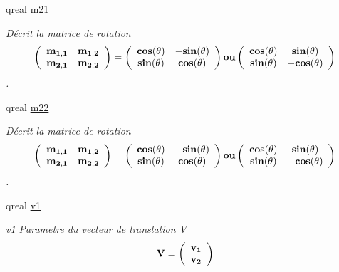 \begin{DoxyCompactItemize}
qreal \hyperlink{class_application_a57f2364c5671f6ade315024cff46c975}{m21}
\begin{DoxyCompactList}\small\item\em Décrit la matrice de rotation \[ \bf \left( \begin{array}{ccc} \bf m_{1,1} & \bf m_{1,2} \\ \bf m_{2,1} & \bf m_{2,2} \\ \end{array} \bf\right) \bf= \bf\left( \begin{array}{ccc} \bf cos(\bf\theta) & \bf -sin(\bf\theta) \\ \bf sin(\bf\theta) & \bf cos(\bf\theta) \\ \end{array} \bf\right) \bf ou \bf\left( \begin{array}{ccc} \bf cos(\bf\theta) & \bf sin(\bf\theta) \\ \bf sin(\bf\theta) & \bf -cos(\bf\theta) \\ \end{array} \bf\right) \]. \end{DoxyCompactList}\item 
qreal \hyperlink{class_application_aa3e7dad170dc62450e06855fdeea42af}{m22}
\begin{DoxyCompactList}\small\item\em Décrit la matrice de rotation \[ \bf \left( \begin{array}{ccc} \bf m_{1,1} & \bf m_{1,2} \\ \bf m_{2,1} & \bf m_{2,2} \\ \end{array} \bf\right) \bf= \bf\left( \begin{array}{ccc} \bf cos(\bf\theta) & \bf -sin(\bf\theta) \\ \bf sin(\bf\theta) & \bf cos(\bf\theta) \\ \end{array} \bf\right) \bf ou \bf\left( \begin{array}{ccc} \bf cos(\bf\theta) & \bf sin(\bf\theta) \\ \bf sin(\bf\theta) & \bf -cos(\bf\theta) \\ \end{array} \bf\right) \]. \end{DoxyCompactList}\item 
qreal \hyperlink{class_application_aec5855e0925af60f70007a7836883372}{v1}
\begin{DoxyCompactList}\small\item\em v1 Parametre du vecteur de translation V \[\bf V\bf= \bf\left( \begin{array}{ccc} \bf v_{1}\\ \bf v_{2}\\ \end{array} \bf\right) \] \end{DoxyCompactList}\item 

\end{DoxyCompactItemize}
